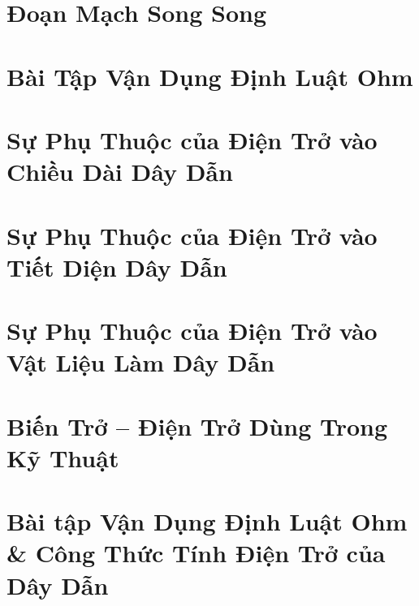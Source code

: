 \documentclass{article}
\begin{document}

\section{Đoạn Mạch Song Song}


\section{Bài Tập Vận Dụng Định Luật Ohm}


\section{Sự Phụ Thuộc của Điện Trở vào Chiều Dài Dây Dẫn}


\section{Sự Phụ Thuộc của Điện Trở vào Tiết Diện Dây Dẫn}


\section{Sự Phụ Thuộc của Điện Trở vào Vật Liệu Làm Dây Dẫn}


\section{Biến Trở -- Điện Trở Dùng Trong Kỹ Thuật}


\section{Bài tập Vận Dụng Định Luật Ohm \& Công Thức Tính Điện Trở của Dây Dẫn}
\end{document}
